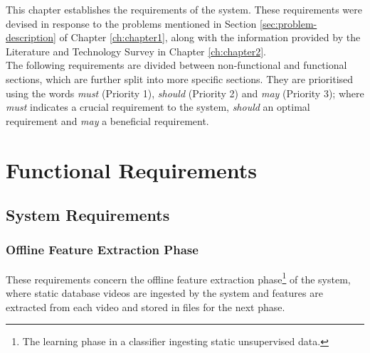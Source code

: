 This chapter establishes the requirements of the system. These requirements were devised in response to the problems mentioned in Section \ref{sec:problem-description} of Chapter \ref{ch:chapter1}, along with the information provided by the Literature and Technology Survey in Chapter \ref{ch:chapter2}.\\

The following requirements are divided between non-functional and functional sections, which are further split into more specific sections. They are prioritised using the words \textit{must} (Priority 1), \textit{should} (Priority 2) and \textit{may} (Priority 3); where \textit{must} indicates a crucial requirement to the system, \textit{should} an optimal requirement and \textit{may} a beneficial requirement.


\section{Functional Requirements}

\subsection{System Requirements}

\subsubsection{Offline Feature Extraction Phase}

These requirements concern the offline feature extraction phase\footnote{The learning phase in a classifier ingesting static unsupervised data.} of the system, where static database videos are ingested by the system and features are extracted from each video and stored in files for the next phase.

